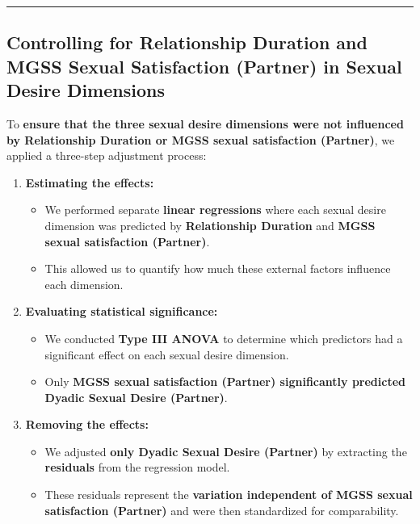 \documentclass[
  bookmarksnumbered]{article}
\providecommand{\tightlist}{%
  \setlength{\itemsep}{0pt}\setlength{\parskip}{0pt}}
\begin{document}
\begin{center}\rule{0.5\linewidth}{0.5pt}\end{center}

\subsection{Controlling for Relationship Duration and MGSS Sexual Satisfaction (Partner) in Sexual Desire Dimensions}\label{controlling-for-relationship-duration-and-mgss-sexual-satisfaction-partner-in-sexual-desire-dimensions}

To \textbf{ensure that the three sexual desire dimensions were not influenced by Relationship Duration or MGSS sexual satisfaction (Partner)}, we applied a three-step adjustment process:

\begin{enumerate}
\def\labelenumi{\arabic{enumi}.}
\tightlist
\item
  \textbf{Estimating the effects:}

  \begin{itemize}
  \tightlist
  \item
    We performed separate \textbf{linear regressions} where each sexual desire dimension was predicted by \textbf{Relationship Duration} and \textbf{MGSS sexual satisfaction (Partner)}.
  \item
    This allowed us to quantify how much these external factors influence each dimension.
  \end{itemize}
\item
  \textbf{Evaluating statistical significance:}

  \begin{itemize}
  \tightlist
  \item
    We conducted \textbf{Type III ANOVA} to determine which predictors had a significant effect on each sexual desire dimension.
  \item
    Only \textbf{MGSS sexual satisfaction (Partner) significantly predicted Dyadic Sexual Desire (Partner)}.
  \end{itemize}
\item
  \textbf{Removing the effects:}

  \begin{itemize}
  \tightlist
  \item
    We adjusted \textbf{only Dyadic Sexual Desire (Partner)} by extracting the \textbf{residuals} from the regression model.
  \item
    These residuals represent the \textbf{variation independent of MGSS sexual satisfaction (Partner)} and were then standardized for comparability.
  \end{itemize}
\end{enumerate}
\end{document}
